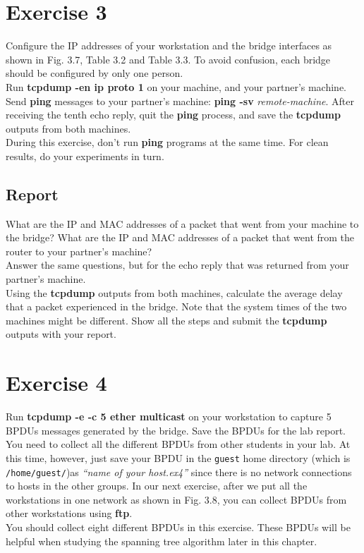 \documentclass[10pt,a4paper]{article}
\numberwithin{equation}{section}
\numberwithin{figure}{section}
\numberwithin{table}{section}
\begin{document}
    \section{ Exercise 3}
    Configure the IP addresses of your workstation and the bridge interfaces as shown in Fig. 3.7, Table 3.2 and Table 3.3.
    To avoid confusion, each bridge should be configured by only one person. \\
    Run \textbf{tcpdump -en ip proto 1} on your machine, and your partner’s machine. Send \textbf{ping} messages to your partner’s machine: \textbf{ping -sv} \textit{remote-machine}.
    After receiving the tenth echo reply, quit the \textbf{ping} process, and save the \textbf{tcpdump} outputs from both machines. \\
    During this exercise, don’t run \textbf{ping} programs at the same time. For clean results, do your experiments in turn.
    \subsection*{Report}
    What are the IP and MAC addresses of a packet that went from your machine to the bridge?
    What are the IP and MAC addresses of a packet that went from the router to your partner’s machine? \\
    Answer the same questions, but for the echo reply that was returned from your partner’s machine. \\
    Using the \textbf{tcpdump} outputs from both machines, calculate the average delay that a packet experienced in the bridge.
    Note that the system times of the two machines might be different.
    Show all the steps and submit the \textbf{tcpdump} outputs with your report.


    \section{ Exercise 4}
    Run \textbf{tcpdump -e -c 5 ether multicast} on your workstation to capture 5 BPDUs messages generated by the bridge.
    Save the BPDUs for the lab report. \\
    You need to collect all the different BPDUs from other students in your lab.
    At this time, however, just save your BPDU in the \texttt{guest} home directory (which is \texttt{/home/guest/})as \textit{“name of your host.ex4”} since there is no network connections to hosts in the other groups.
    In our next exercise, after we put all the workstations in one network as shown in Fig. 3.8, you can collect BPDUs from other workstations using \textbf{ftp}. \\
    You should collect eight different BPDUs in this exercise.
    These BPDUs will be helpful when studying the spanning tree algorithm later in this chapter.
\end{document}
